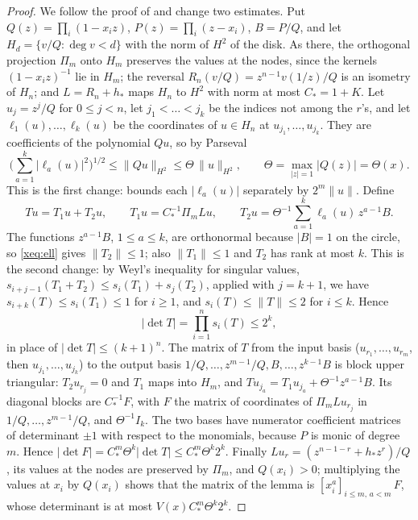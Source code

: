 \documentclass[11pt]{article}
\theoremstyle{definition}
\begin{document}
\begin{proof}
We follow the proof of \cite[Lemma~4.1]{Jha} and change two estimates. Put $Q(z)=\prod_i(1-x_iz)$, $P(z)=\prod_i(z-x_i)$, $B=P/Q$, and let $H_d=\{v/Q:\deg v<d\}$ with the norm of $H^2$ of the disk. As there, the orthogonal projection $\Pi_m$ onto $H_m$ preserves the values at the nodes, since the kernels $(1-x_iz)^{-1}$ lie in $H_m$; the reversal $R_n(v/Q)=z^{n-1}v(1/z)/Q$ is an isometry of $H_n$; and $L=R_n+h_*$ maps $H_n$ to $H^2$ with norm at most $C_*=1+K$. Let $u_j=z^j/Q$ for $0\le j<n$, let $j_1<\dots<j_k$ be the indices not among the $r$'s, and let $\ell_1(u),\dots,\ell_k(u)$ be the coordinates of $u\in H_n$ at $u_{j_1},\dots,u_{j_k}$. They are coefficients of the polynomial $Qu$, so by Parseval
\begin{equation}\label{xeq:ell}
\Big(\sum_{a=1}^k|\ell_a(u)|^2\Big)^{1/2}\le\|Qu\|_{H^2}\le \Theta\,\|u\|_{H^2},\qquad \Theta=\max_{|z|=1}|Q(z)|=\Theta(x).
\end{equation}
This is the first change: \cite[(4.2)]{Jha} bounds each $|\ell_a(u)|$ separately by $2^m\|u\|$. Define
\[
Tu=T_1u+T_2u,\qquad T_1u=C_*^{-1}\Pi_mLu,\qquad T_2u=\Theta^{-1}\sum_{a=1}^k\ell_a(u)\,z^{a-1}B .
\]
The functions $z^{a-1}B$, $1\le a\le k$, are orthonormal because $|B|=1$ on the circle, so \eqref{xeq:ell} gives $\|T_2\|\le1$; also $\|T_1\|\le1$ and $T_2$ has rank at most $k$. This is the second change: by Weyl's inequality for singular values, $s_{i+j-1}(T_1+T_2)\le s_i(T_1)+s_j(T_2)$, applied with $j=k+1$, we have $s_{i+k}(T)\le s_i(T_1)\le1$ for $i\ge1$, and $s_i(T)\le\|T\|\le2$ for $i\le k$. Hence
\[
|\det T|=\prod_{i=1}^ns_i(T)\le2^k,
\]
in place of $|\det T|\le(k+1)^n$. The matrix of $T$ from the input basis ($u_{r_1},\dots,u_{r_m}$, then $u_{j_1},\dots,u_{j_k}$) to the output basis $1/Q,\dots,z^{m-1}/Q,B,\dots,z^{k-1}B$ is block upper triangular: $T_2u_{r_j}=0$ and $T_1$ maps into $H_m$, and $Tu_{j_a}=T_1u_{j_a}+\Theta^{-1}z^{a-1}B$. Its diagonal blocks are $C_*^{-1}F$, with $F$ the matrix of coordinates of $\Pi_mLu_{r_j}$ in $1/Q,\dots,z^{m-1}/Q$, and $\Theta^{-1}I_k$. The two bases have numerator coefficient matrices of determinant $\pm1$ with respect to the monomials, because $P$ is monic of degree $m$. Hence $|\det F|=C_*^m \Theta^k|\det T|\le C_*^m\Theta^k2^k$. Finally $Lu_r=(z^{n-1-r}+h_*z^r)/Q$, its values at the nodes are preserved by $\Pi_m$, and $Q(x_i)>0$; multiplying the values at $x_i$ by $Q(x_i)$ shows that the matrix of the lemma is $[x_i^{a}]_{i\le m,\,a<m}\,F$, whose determinant is at most $V(x)C_*^m\Theta^k2^k$.
\end{proof}
\end{document}

